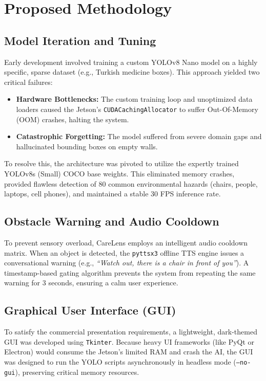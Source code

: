 \documentclass[conference]{IEEEtran}
\begin{document}
\section{Proposed Methodology}

\subsection{Model Iteration and Tuning}
Early development involved training a custom YOLOv8 Nano model on a highly specific, sparse dataset (e.g., Turkish medicine boxes). This approach yielded two critical failures:
\begin{itemize}
    \item \textbf{Hardware Bottlenecks:} The custom training loop and unoptimized data loaders caused the Jetson's \texttt{CUDACachingAllocator} to suffer Out-Of-Memory (OOM) crashes, halting the system.
    \item \textbf{Catastrophic Forgetting:} The model suffered from severe domain gaps and hallucinated bounding boxes on empty walls.
\end{itemize}
To resolve this, the architecture was pivoted to utilize the expertly trained YOLOv8s (Small) COCO base weights. This eliminated memory crashes, provided flawless detection of 80 common environmental hazards (chairs, people, laptops, cell phones), and maintained a stable 30 FPS inference rate.

\subsection{Obstacle Warning and Audio Cooldown}
To prevent sensory overload, CareLens employs an intelligent audio cooldown matrix. When an object is detected, the \texttt{pyttsx3} offline TTS engine issues a conversational warning (e.g., \textit{``Watch out, there is a chair in front of you''}). A timestamp-based gating algorithm prevents the system from repeating the same warning for 3 seconds, ensuring a calm user experience.

\subsection{Graphical User Interface (GUI)}
To satisfy the commercial presentation requirements, a lightweight, dark-themed GUI was developed using \texttt{Tkinter}. Because heavy UI frameworks (like PyQt or Electron) would consume the Jetson's limited RAM and crash the AI, the GUI was designed to run the YOLO scripts asynchronously in headless mode (\texttt{--no-gui}), preserving critical memory resources.
\end{document}
